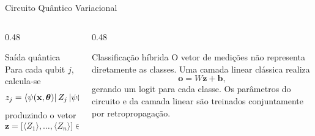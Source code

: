 \begin{frame}[shrink=15]{Circuito Quântico Variacional}
  
  \vspace{1.5cm}

  \begin{columns}[T,onlytextwidth]

    \begin{column}{0.48\textwidth}
      \begin{block}{Saída quântica}
      Para cada qubit $j$, calcula-se
      \[
        z_j
        =
        \bra{\psi(\mathbf{x},\boldsymbol{\theta})}
        Z_j
        \ket{\psi(\mathbf{x},\boldsymbol{\theta})},
      \]
      produzindo o vetor
      \[
        \mathbf{z}
        =
        \big[
          \langle Z_1\rangle,
          \ldots,
          \langle Z_n\rangle
        \big]
        \in[-1,1]^n.
      \]
      \end{block}
    \end{column}

    \begin{column}{0.48\textwidth}
      \begin{alertblock}{Classificação híbrida}
      O vetor de medições não representa diretamente as classes. Uma camada
      linear clássica realiza
      \[
        \mathbf{o}
        =
        W\mathbf{z}+\mathbf{b},
      \]
      gerando um logit para cada classe. Os parâmetros do circuito e da camada
      linear são treinados conjuntamente por retropropagação.
      \end{alertblock}

    \end{column}

  \end{columns}
\end{frame}


